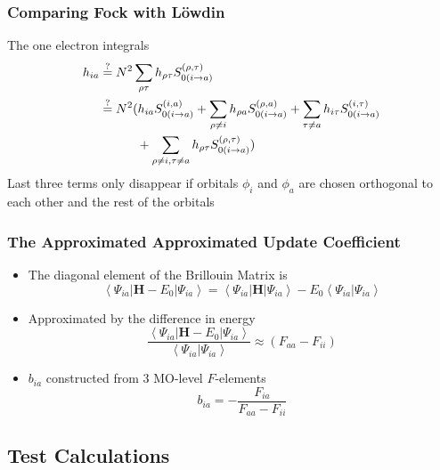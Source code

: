 \documentclass[]{beamer}
\begin{document}
\begin{frame}
  \frametitle{Comparing Fock with L\"owdin}
  The one electron integrals
  \begin{equation*}
\begin{split}
h_{ia} &\stackrel {?}{=} N^2 \sum_{\rho\tau} h_{\rho\tau} S_{0(i\rightarrow a)}^{(\rho,\tau)} \\
&\stackrel {?}{=} N^2 (h_{ia} S_{0(i\rightarrow a)}^{(i,a)} +\sum_{\rho \ne i} h_{\rho a} S_{0(i\rightarrow a)}^{(\rho,a)} +  \sum_{\tau \ne a} h_{i\tau} S_{0(i\rightarrow a)}^{(i,\tau)} \\
&\hspace{30px}+\sum_{\rho \ne i, \tau \ne a} h_{\rho\tau} S_{0(i\rightarrow a)}^{(\rho,\tau)})
\end{split}
\end{equation*}
Last three terms only disappear if orbitals $\phi_i$ and $\phi_a$ are chosen orthogonal to each other and the rest of the orbitals
\end{frame}

\begin{frame}
  \frametitle{The Approximated Approximated Update Coefficient}
  \begin{itemize}
  \item {The diagonal element of the Brillouin Matrix is}
  \begin{equation*}
  \left< \Psi_{ia} | \mathbf{H}-E_0 | \Psi_{ia} \right>  =  \left< \Psi_{ia} | \mathbf{H} | \Psi_{ia} \right>  - E_0 \left< \Psi_{ia} | \Psi_{ia} \right>
  \end{equation*}
  \item{Approximated by the difference in energy}
  \begin{equation*}
  \frac{\left< \Psi_{ia} | \mathbf{H}-E_0 | \Psi_{ia} \right>}{\left< \Psi_{ia} | \Psi_{ia} \right>} \approx (F_{aa}-F_{ii})
  \end{equation*}
  \item{$b_{ia}$ constructed from 3 MO-level $F$-elements}
  \begin{equation*}
  b_{ia}= - \frac{F_{ia}}{F_{aa}-F_{ii}}
  \end{equation*}
  \end{itemize}
\end{frame}

\subsection{Test Calculations}
\end{document}
